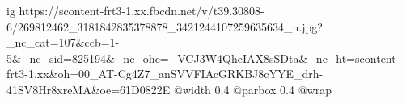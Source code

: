  
 
 
 
 

\ifcmt
  ig https://scontent-frt3-1.xx.fbcdn.net/v/t39.30808-6/269812462_3181842835378878_3421244107259635634_n.jpg?_nc_cat=107&ccb=1-5&_nc_sid=825194&_nc_ohc=_VCJ3W4QheIAX8sSDta&_nc_ht=scontent-frt3-1.xx&oh=00_AT-Cg4Z7_anSVVFIAcGRKBJ8cYYE_drh-41SV8Hr8xreMA&oe=61D0822E
  @width 0.4
  @parbox 0.4
  @wrap \parpic[r]
\fi
